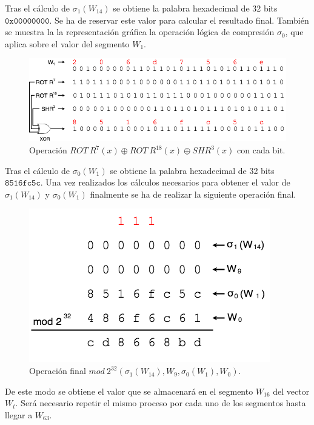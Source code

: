 \documentclass{article}
\begin{document}
        Tras el cálculo de $\sigma_{1}(W_{14})$ se obtiene la palabra hexadecimal de 32 bits $\texttt{0x00000000}$. Se ha de reservar este valor para calcular el resultado final. También se muestra la la representación gráfica la operación lógica de compresión $\sigma_{0}$, que aplica sobre el valor del segmento $W_{1}$.
        \begin{figure}[H]
        \centering
            \includegraphics[scale=0.445]{img/SHA-256-Wt_operation_sigma0.png}
            \caption{Operación $ROT \ R^{7}(x) \oplus ROT \ R^{18}(x) \oplus SHR^{3}(x)$ con cada bit.}
        \end{figure}
        
        Tras el cálculo de $\sigma_{0}(W_{1})$ se obtiene la palabra hexadecimal de 32 bits $\texttt{8516fc5c}$. Una vez realizados los cálculos necesarios para obtener el valor de $\sigma_{1}(W_{14})$ y $\sigma_{0}(W_{1})$ finalmente se ha de realizar la siguiente operación final.
        \begin{figure}[H]
        \centering
            \includegraphics[scale=0.445]{img/SHA-256-Wt_operation_mod2_32_final.png}
            \caption{Operación final $mod \ 2^{32} (\sigma_{1}(W_{14}), W_{9}, \sigma_{0}(W_{1}), W_{0})$.}
        \end{figure}
        
        De este modo se obtiene el valor que se almacenará en el segmento $W_{16}$ del vector $W_t$. Será necesario repetir el mismo proceso por cada uno de los segmentos hasta llegar a $W_{63}$.
        
\end{document}
